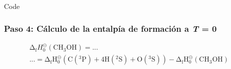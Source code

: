 \documentclass{beamer}
\begin{document}
\begin{frame}[fragile]{Code}
\frametitle{Paso 4: Cálculo de la entalpía de formación a \textit{T} = 0}

\begin{multline}
	\mathrm{\Delta}_\mathrm{{f}} H^{\circleddash}_{0}\mathrm{(CH_3OH)} =... \\ ...= \mathrm{\Delta_{f} H^{\circleddash}_{0}} \mathrm{(C(^{3}P) + 4H(^{2}S) + O(^{3}S))- \Delta_{f} H^{\circleddash}_{0} (CH_{3}OH)}
\label{eq:4.6}
\end{multline}


\end{frame}


\end{document}
